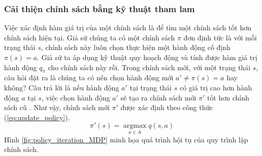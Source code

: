 \subsubsection{Cải thiện chính sách bằng kỹ thuật tham lam}
Việc xác định hàm giá trị của một chính sách là để tìm một chính sách tốt hơn chính sách hiện tại. 
Giả sử chúng ta có một chính sách $\pi$ đơn định tức là với mỗi trạng thái $s$, chính sách này luôn chọn thực hiện một hành động cố định $\pi(s) = a$. 
Giả sử ta áp dụng kỹ thuật quy hoạch động và tính được hàm giá trị hành động $q_{\pi}$ cho chính sách này rồi. 
Trong chính sách mới, với một trạng thái $s$, câu hỏi đặt ra là chúng ta có nên chọn hành động mới $a' \neq \pi(s) = a$ hay không? 
Câu trả lời là nếu hành động $a'$ tại trạng thái $s$ có giá trị cao hơn hành động $a$ tại $s$, việc chọn hành động $a'$ sẽ tạo ra chính sách mới $\pi'$ tốt hơn chính sách cũ \cite{sutton1998introduction}. 
Như vậy, chính sách mới $\pi'$ được xác định theo công thức (\ref{eq:update_policy}).
\begin{equation}
\label{eq:update_policy}
\pi'(s) = \underset{a \in A}{\operatorname{argmax}} q(s,a)
\end{equation}
Hình \ref{fig:policy_iteration_MDP} minh họa quá trình hội tụ của quy trình lặp chính sách.
